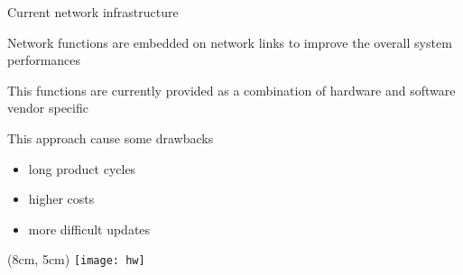 \begin{frame}{Current network infrastructure}

  \vfill{}

  Network functions are embedded on network links to improve the overall system
  performances

  \vfill{}

  This functions are currently provided as a combination of hardware and
  software vendor specific

  \vfill{}

  This approach cause some drawbacks
  \begin{itemize}
    \item long product cycles
    \item higher costs
    \item more difficult updates
  \end{itemize}

  \vfill{}

  \begin{textblock*}{1cm}(8cm, 5cm)
    \texttt{[image: hw]}
  \end{textblock*}

\end{frame}